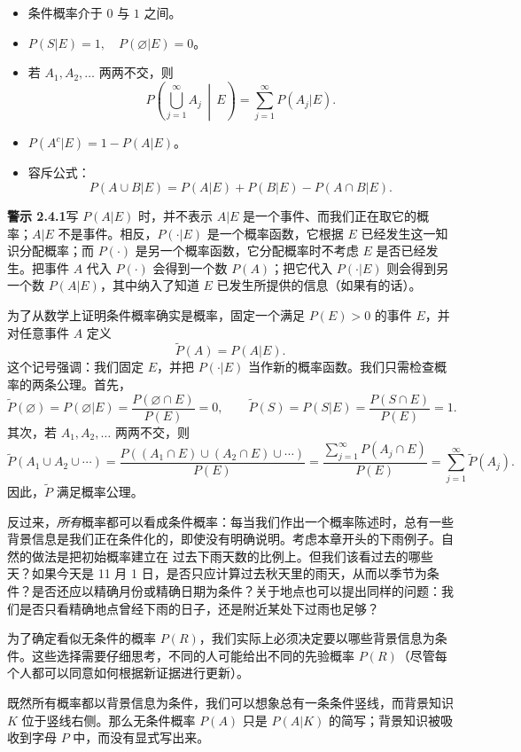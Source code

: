 \documentclass[UTF8,12pt,a4paper,fontset=fandol]{ctexart}
\begin{document}
\begin{itemize}
  \item 条件概率介于 $0$ 与 $1$ 之间。
  \item $P(S|E)=1,\quad P(\varnothing|E)=0$。
  \item 若 $A_1,A_2,\ldots$ 两两不交，则
  \[
    P\left(\bigcup_{j=1}^{\infty}A_j\,\middle|\,E\right)
    =
    \sum_{j=1}^{\infty}P(A_j|E).
  \]
  \item $P(A^c|E)=1-P(A|E)$。
  \item 容斥公式：
  \[
    P(A\cup B|E)=P(A|E)+P(B|E)-P(A\cap B|E).
  \]
\end{itemize}

\noindent\textbf{警示 2.4.1}\quad 写 $P(A|E)$ 时，并不表示 $A|E$ 是一个事件、而我们正在取它的概率；$A|E$ 不是事件。相反，$P(\cdot|E)$ 是一个概率函数，它根据 $E$ 已经发生这一知识分配概率；而 $P(\cdot)$ 是另一个概率函数，它分配概率时不考虑 $E$ 是否已经发生。把事件 $A$ 代入 $P(\cdot)$ 会得到一个数 $P(A)$；把它代入 $P(\cdot|E)$ 则会得到另一个数 $P(A|E)$，其中纳入了知道 $E$ 已发生所提供的信息（如果有的话）。

为了从数学上证明条件概率确实是概率，固定一个满足 $P(E)>0$ 的事件 $E$，并对任意事件 $A$ 定义
\[
  \widetilde P(A)=P(A|E).
\]
这个记号强调：我们固定 $E$，并把 $P(\cdot|E)$ 当作新的概率函数。我们只需检查概率的两条公理。首先，
\[
  \widetilde P(\varnothing)=P(\varnothing|E)
  =
  \frac{P(\varnothing\cap E)}{P(E)}=0,\qquad
  \widetilde P(S)=P(S|E)
  =
  \frac{P(S\cap E)}{P(E)}=1.
\]
其次，若 $A_1,A_2,\ldots$ 两两不交，则
\[
  \widetilde P(A_1\cup A_2\cup\cdots)
  =
  \frac{P((A_1\cap E)\cup(A_2\cap E)\cup\cdots)}{P(E)}
  =
  \frac{\sum_{j=1}^{\infty}P(A_j\cap E)}{P(E)}
  =
  \sum_{j=1}^{\infty}\widetilde P(A_j).
\]
因此，$\widetilde P$ 满足概率公理。

反过来，\textit{所有}概率都可以看成条件概率：每当我们作出一个概率陈述时，总有一些背景信息是我们正在条件化的，即使没有明确说明。考虑本章开头的下雨例子。自然的做法是把初始概率建立在
过去下雨天数的比例上。但我们该看过去的哪些天？如果今天是 11 月 1 日，是否只应计算过去秋天里的雨天，从而以季节为条件？是否还应以精确月份或精确日期为条件？关于地点也可以提出同样的问题：我们是否只看精确地点曾经下雨的日子，还是附近某处下过雨也足够？

为了确定看似无条件的概率 $P(R)$，我们实际上必须决定要以哪些背景信息为条件。这些选择需要仔细思考，不同的人可能给出不同的先验概率 $P(R)$（尽管每个人都可以同意如何根据新证据进行更新）。

既然所有概率都以背景信息为条件，我们可以想象总有一条条件竖线，而背景知识 $K$ 位于竖线右侧。那么无条件概率 $P(A)$ 只是 $P(A|K)$ 的简写；背景知识被吸收到字母 $P$ 中，而没有显式写出来。
\end{document}
